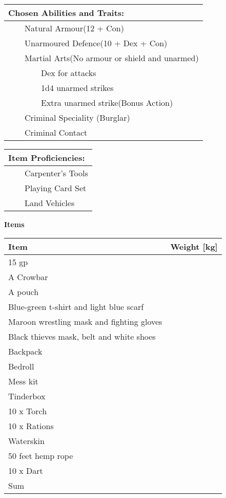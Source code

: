 \documentclass[11pt]{article}
\newcommand{\tabitem}{~~\llap{--}~~}
\newcommand{\tabtabitem}{~~~~~~\llap{$\bullet$}~~}
\begin{document}
\begin{multicols}{2}
\vspace{4mm}

\noindent \begin{tabularx}{95mm}{@{}l}
{\Large \textbf{Chosen Abilities and Traits:}} \\
\hline
\tabitem Natural Armour(12 + Con) \\
\tabitem Unarmoured Defence(10 + Dex + Con) \\
\tabitem Martial Arts(No armour or shield and unarmed) \\
\tabtabitem Dex for attacks \\
\tabtabitem 1d4 unarmed strikes \\
\tabtabitem Extra unarmed strike(Bonus Action) \\
\tabitem Criminal Speciality (Burglar) \\
\tabitem Criminal Contact
		\end{tabularx}

\vspace{4mm}

\noindent \begin{tabularx}{95mm}{@{}l}
{\Large \textbf{Item Proficiencies:}} \\
\hline
\tabitem Carpenter's Tools \\
\tabitem Playing Card Set \\
\tabitem Land Vehicles
		\end{tabularx}
	\end{multicols}

\clearpage

	\begin{center}
{\LARGE \textbf{Items}}
	\end{center}

	\begin{tabularx}{\textwidth}{X|r}
Item & Weight [kg] \\
\hline
15 gp 										& 			\\
A Crowbar									& 		 	\\
A pouch										& 			\\
Blue-green t-shirt and light blue scarf 	&			\\
Maroon wrestling mask and fighting gloves 	&			\\
Black thieves mask, belt and white shoes 	& 			\\
Backpack									&	 	 	\\
Bedroll										& 			\\
Mess kit								 	&			\\
Tinderbox								 	&			\\
10 x Torch								 	& 			\\
10 x Rations								&	 	 	\\
Waterskin									& 			\\
50 feet hemp rope						 	&			\\
10 x Dart								 	&			\\
\hline
Sum 										& 
	\end{tabularx}
\end{document}
